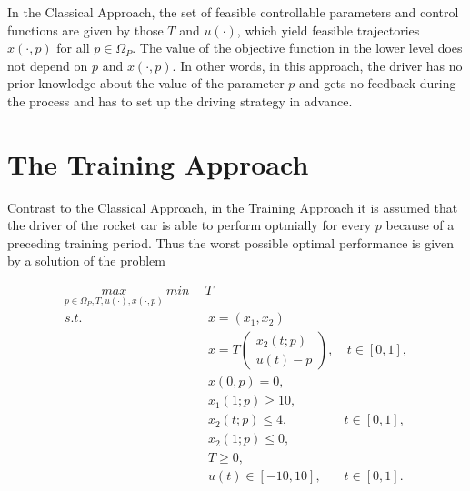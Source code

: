 In the Classical Approach, the set of feasible controllable parameters and control functions are given by those $T$ and $u(\cdot)$, which yield feasible trajectories $x(\cdot, p)$ for all $p \in \Omega_P$. The value of the objective function in the lower level does not depend on $p$ and $x(\cdot, p)$. In other words, in this approach, the driver has no prior knowledge about the value of the parameter $p$ and gets no feedback during the process and has to set up the driving strategy in advance. 



\section{The Training Approach}

Contrast to the Classical Approach, in the Training Approach it is assumed that the driver of the rocket car is able to perform optmially for every $p$ because of a preceding training period. Thus the worst possible optimal performance is given by a solution of the problem

\begin{subequations}
	\begin{align}
	   \underset{p \in \Omega_P, T, u(\cdot), x(\cdot,p)}{max}  \ 	\underset{}{min} \   & \  T \\ 
		s.t.  & \ \ x = (x_1, x_2)   \label{rc_x} \\ 
             & \ \  \dot{x} = T  \begin{pmatrix}  x_2(t;p) \\ u(t)-p   \end{pmatrix}, & \ t \in [0,1],  \label{rc_partial} \\
& \ \ x(0,p) = 0, \label{rc_t0}\\
& \ \ x_1(1;p) \geq 10, \label{rc_x1_t1} \\
& \ \ x_2(t;p) \leq 4, & t \in [0,1], \label{rc_x2_tc} \\
& \ \ x_2(1;p) \leq 0, \label{rc_x2_t1}  \\
& \ \ T \geq 0, \\
& \ \ u(t) \in [-10, 10], & t \in [0,1]. 
	\end{align}
	\label{ca_rc}
\end{subequations}













